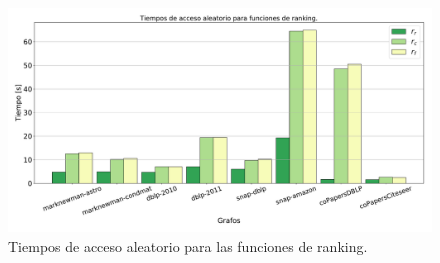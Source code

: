 \begin{figure}
    	\centering
    	\includegraphics[width=1\linewidth]{img/timesRanking.pdf}
    	
    \caption{Tiempos de acceso aleatorio para las funciones de ranking.}
    \label{fig:timesRanking}
\end{figure}

